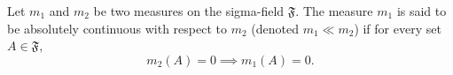 Let $m_1$ and $m_2$ be two measures on the sigma-field $\mathfrak{F}$. The measure $m_1$ is said to be absolutely continuous with respect to $m_2$ (denoted $m_1 \ll m_2$) if for every set $A \in \mathfrak{F}$,
$$m_2(A) = 0 \implies m_1(A) = 0.$$
